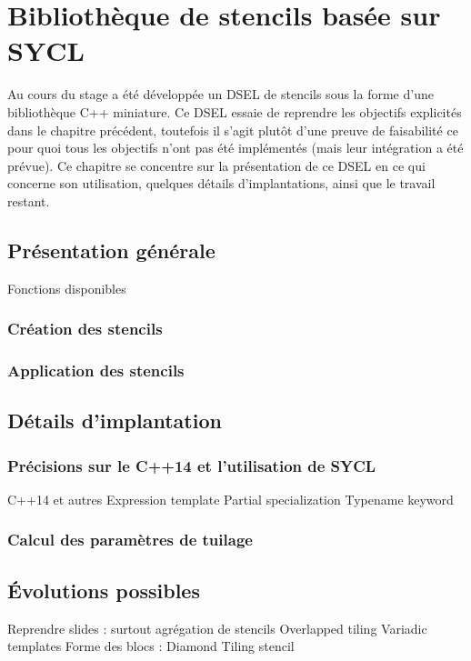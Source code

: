 
\chapter{Bibliothèque de stencils basée sur SYCL}

Au cours du stage a été développée un DSEL de stencils sous la forme d'une bibliothèque \textsf{C++} miniature. Ce DSEL essaie de reprendre les objectifs explicités dans le chapitre précédent, toutefois il s'agit plutôt d'une preuve de faisabilité ce pour quoi tous les objectifs n'ont pas été implémentés (mais leur intégration a été prévue). Ce chapitre se concentre sur la présentation de ce DSEL en ce qui concerne son utilisation, quelques détails d'implantations, ainsi que le travail restant.

\section{Présentation générale}

Fonctions disponibles

\subsection{Création des stencils}

\subsection{Application des stencils}



\section{Détails d'implantation}

\subsection{Précisions sur le \textsf{C++14} et l'utilisation de \textsf{SYCL}}

C++14 et autres
Expression template \cite{Web4,Art21}
Partial specialization \cite{Web1}
Typename keyword \cite{Web2}

\subsection{Calcul des paramètres de tuilage}
\label{sec:param_tuile}



\section{\'Evolutions possibles}
\label{sec:evol_biblio}

Reprendre slides : surtout agrégation de stencils
Overlapped tiling \cite{Art17}
Variadic templates \cite{Art6}
Forme des blocs : Diamond Tiling stencil \cite{Art16}


